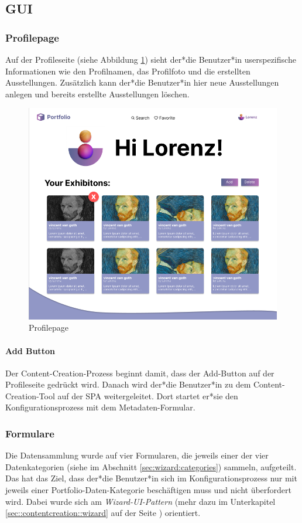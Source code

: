 \subsection{GUI}
\subsubsection{Profilepage}
Auf der Profileseite (siehe Abbildung \ref{fig:impl:sign:profile}) sieht der*die Benutzer*in userspezifische Informationen wie den Profilnamen, das Profilfoto und die erstellten Ausstellungen. Zusätzlich kann der*die Benutzer*in hier neue Ausstellungen anlegen und bereits erstellte Ausstellungen löschen.

\begin{figure}
  \centering
  \includegraphics[scale=0.5]{pics/profilepage.png}
  \caption{Profilepage}
  \label{fig:impl:sign:profile}
\end{figure}

\paragraph*{Add Button}
Der Content-Creation-Prozess beginnt damit, dass der Add-Button auf der Profileseite gedrückt wird. Danach wird der*die Benutzer*in zu dem Content-Creation-Tool auf der SPA weitergeleitet. Dort startet er*sie den Konfigurationsprozess mit dem Metadaten-Formular.


\subsubsection{Formulare}
Die Datensammlung wurde auf vier Formularen, die jeweils einer der vier Datenkategorien (siehe im Abschnitt \ref{sec:wizard:categories}) sammeln, aufgeteilt. Das hat das Ziel, dass der*die Benutzer*in sich im Konfigurationsprozess nur mit jeweils einer Portfolio-Daten-Kategorie beschäftigen muss und nicht überfordert wird. Dabei wurde sich am \emph{Wizard-UI-Pattern} (mehr dazu im Unterkapitel \ref{sec::contentcreation::wizard} auf der Seite \pageref{sec::contentcreation::wizard}) orientiert.


